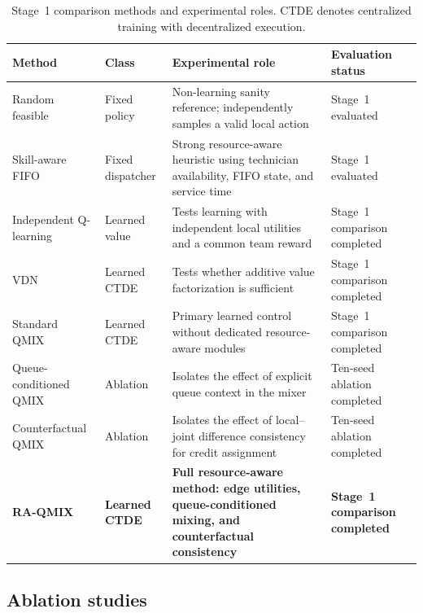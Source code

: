 \documentclass[11pt]{article}
\begin{document}
\begin{table}[H]
\centering
\caption{Stage~1 comparison methods and experimental roles. CTDE denotes centralized training with decentralized execution.}
\label{tab:baseline-comparison}
\scriptsize
\renewcommand{\arraystretch}{1.08}
\setlength{\tabcolsep}{3pt}
\begin{tabularx}{\linewidth}{
    >{\raggedright\arraybackslash}p{2.25cm}
    >{\raggedright\arraybackslash}p{1.65cm}
    >{\raggedright\arraybackslash}p{4.25cm}
    >{\raggedright\arraybackslash}X}
\toprule
Method & Class & Experimental role & Evaluation status \\
\midrule
Random feasible & Fixed policy & Non-learning sanity reference; independently samples a valid local action & Stage~1 evaluated \\
Skill-aware FIFO & Fixed dispatcher & Strong resource-aware heuristic using technician availability, FIFO state, and service time & Stage~1 evaluated \\
\midrule
Independent Q-learning & Learned value & Tests learning with independent local utilities and a common team reward & Stage~1 comparison completed \\
VDN & Learned CTDE & Tests whether additive value factorization is sufficient & Stage~1 comparison completed \\
Standard QMIX & Learned CTDE & Primary learned control without dedicated resource-aware modules & Stage~1 comparison completed \\
\midrule
Queue-conditioned QMIX & Ablation & Isolates the effect of explicit queue context in the mixer & Ten-seed ablation completed \\
Counterfactual QMIX & Ablation & Isolates the effect of local--joint difference consistency for credit assignment & Ten-seed ablation completed \\
\rowcolor{teal!8}
\textbf{RA-QMIX} & \textbf{Learned CTDE} & \textbf{Full resource-aware method: edge utilities, queue-conditioned mixing, and counterfactual consistency} & \textbf{Stage~1 comparison completed} \\
\bottomrule
\end{tabularx}
\end{table}

\subsection{Ablation studies}
\end{document}
